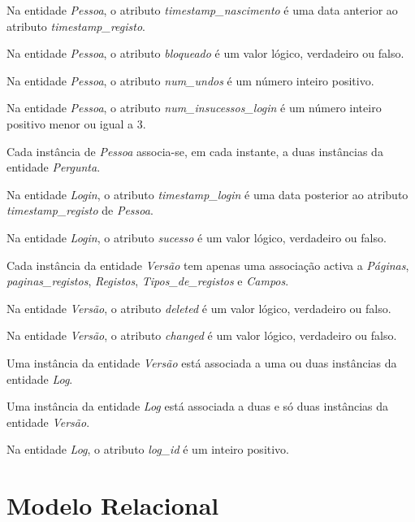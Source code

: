 \documentclass[11pt,a4paper]{article}
\begin{document}
\begin{description}[itemsep=1.4em]
  \item[RI1] Na entidade \textit{Pessoa}, o atributo \textit{timestamp\_nascimento} \'{e} uma data anterior ao atributo \textit{timestamp\_registo}.
  \item[RI2] Na entidade \textit{Pessoa}, o atributo \textit{bloqueado} \'{e} um valor l\'{o}gico, verdadeiro ou falso.


  \item[RI3] Na entidade \textit{Pessoa}, o atributo \textit{num\_undos} \'{e} um n\'{u}mero inteiro positivo.


  \item[RI4] Na entidade \textit{Pessoa}, o atributo \textit{num\_insucessos\_login} \'{e} um n\'{u}mero inteiro positivo menor ou igual a 3.
  \item[RI5] Cada instância de \textit{Pessoa} associa-se, em cada instante, a duas instâncias da entidade \textit{Pergunta}.
  \item[RI6] Na entidade \textit{Login}, o atributo \textit{timestamp\_login} \'{e} uma data posterior ao atributo \textit{timestamp\_registo} de \textit{Pessoa}.
  \item[RI7] Na entidade \textit{Login}, o atributo \textit{sucesso} \'{e} um valor l\'{o}gico, verdadeiro ou falso.
  \item[RI8] Cada instância da entidade \textit{Versão} tem apenas uma associação activa a \textit{P\'{a}ginas}, \textit{paginas\_registos}, \textit{Registos}, \textit{Tipos\_de\_registos} e \textit{Campos}.
  \item[RI9] Na entidade \textit{Versão}, o atributo \textit{deleted} \'{e} um valor l\'{o}gico, verdadeiro ou falso.
  \item[RI10] Na entidade \textit{Versão}, o atributo \textit{changed} \'{e} um valor l\'{o}gico, verdadeiro ou falso.
  \item[RI11] Uma instância da entidade \textit{Versão} est\'{a} associada a uma ou duas instâncias da entidade \textit{Log}.
  \item[RI12] Uma instância da entidade \textit{Log} está associada a duas e s\'{o} duas instâncias da entidade \textit{Versão}.
  \item[RI13] Na entidade \textit{Log}, o atributo \textit{log\_id} \'{e} um inteiro positivo.
\end{description}

\newpage
\section{Modelo Relacional}
\end{document}

